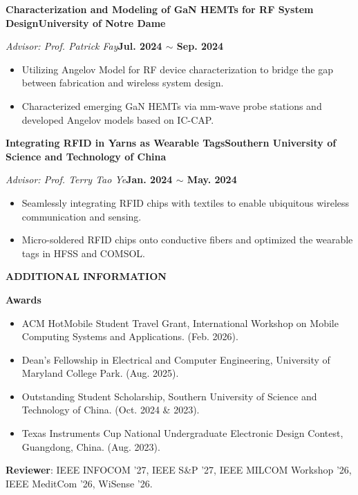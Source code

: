\documentclass[10pt, letterpaper]{article}
\newcommand{\resumesection}[1]{
  \vspace{0.75em}
  \begin{mdframed}[style=sectionstyle]
    \textbf{#1}
  \end{mdframed}
  \vspace{0.75em}
}
\newcommand{\cventry}[5]{ 
  \vspace{0em}
    \textbf{#1}\hfill\textbf{#2}
    \par
    \textit{#3}\hfill\textbf{#4}
    \par
  #5
  \vspace{0em}
}
\newenvironment{cvlist}{%
  \vspace{0em}
  \begin{itemize}[leftmargin=1em, itemsep=0em, topsep=0em, parsep=0em]}{
  \end{itemize}
  \vspace{0.5em}
}
\begin{document}
\cventry
{Characterization and Modeling of GaN HEMTs for RF System Design}
{University of Notre Dame}
{Advisor: Prof. Patrick Fay}
{Jul. 2024 $\sim$ Sep. 2024}
{
  \begin{cvlist}
    \item Utilizing Angelov Model for RF device characterization to bridge the gap between fabrication and wireless system design.
    \item Characterized emerging GaN HEMTs via mm-wave probe stations and developed Angelov models based on IC-CAP.
  \end{cvlist}
}

\cventry
{Integrating RFID in Yarns as Wearable Tags}
{Southern University of Science and Technology of China}
{Advisor: Prof. Terry Tao Ye}
{Jan. 2024 $\sim$ May. 2024}
{
  \begin{cvlist}
    \item Seamlessly integrating RFID chips with textiles to enable ubiquitous wireless communication and sensing.
    \item Micro-soldered RFID chips onto conductive fibers and optimized the wearable tags in HFSS and COMSOL.
  \end{cvlist}
}


\resumesection{ADDITIONAL INFORMATION}

\textbf{Awards}
\begin{cvlist}
    \item ACM HotMobile Student Travel Grant, International Workshop on Mobile Computing Systems and Applications. (Feb. 2026).
    \item Dean's Fellowship in Electrical and Computer Engineering, University of Maryland College Park. (Aug. 2025).
    \item Outstanding Student Scholarship, Southern University of Science and Technology of China. (Oct. 2024 \& 2023).
    \item Texas Instruments Cup National Undergraduate Electronic Design Contest, Guangdong, China. (Aug. 2023).
\end{cvlist}

\textbf{Reviewer}: IEEE INFOCOM '27, IEEE S\&P '27, IEEE MILCOM Workshop '26, IEEE MeditCom '26, WiSense '26.

\end{document}
